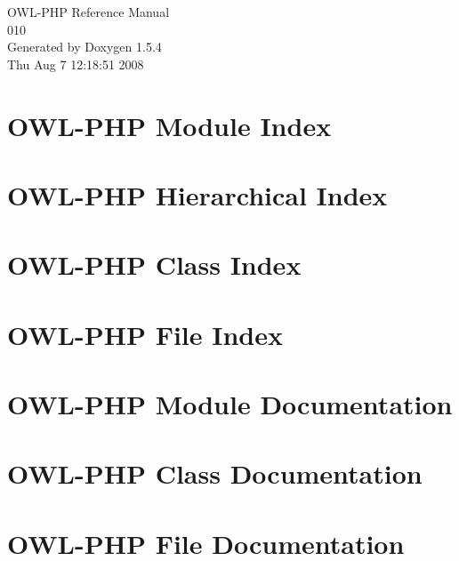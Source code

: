 \documentclass[a4paper]{book}
\begin{document}
\begin{titlepage}
\vspace*{7cm}
\begin{center}
{\Large OWL-PHP Reference Manual\\[1ex]\large 010 }\\
\vspace*{1cm}
{\large Generated by Doxygen 1.5.4}\\
\vspace*{0.5cm}
{\small Thu Aug 7 12:18:51 2008}\\
\end{center}
\end{titlepage}
\clearemptydoublepage
{}
\tableofcontents
\clearemptydoublepage
{}
\chapter{OWL-PHP Module Index}

\chapter{OWL-PHP Hierarchical Index}

\chapter{OWL-PHP Class Index}

\chapter{OWL-PHP File Index}

\chapter{OWL-PHP Module Documentation}




\chapter{OWL-PHP Class Documentation}





\chapter{OWL-PHP File Documentation}










\printindex
\end{document}
